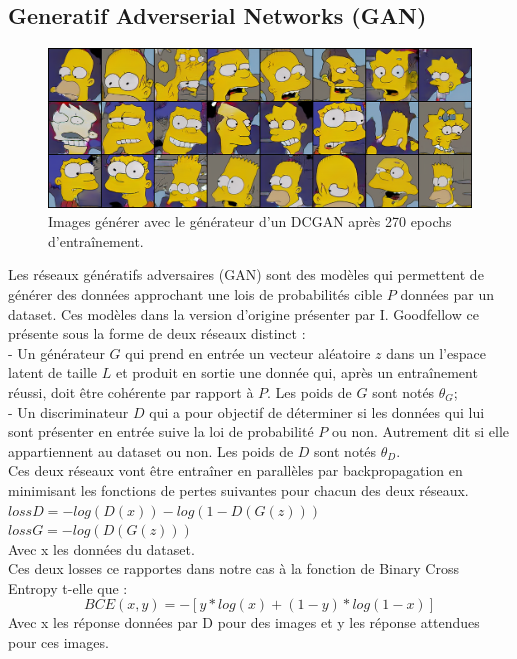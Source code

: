 \documentclass[11pt,francais]{article}
\begin{document}
\subsection{Generatif Adverserial Networks (GAN)}
\label{sec:GAN}

\begin{figure}[!h]
    \centering
    \includegraphics[width=\textwidth]{Figures/resultats_simpsons/DCGAN_270.png}
    \caption{Images générer avec le générateur d'un DCGAN après 270 epochs d'entraînement.}
    \label{fig:fig3}
\end{figure}

Les réseaux génératifs adversaires (GAN) sont des modèles qui permettent de générer des données approchant une lois de probabilités cible \(P\) données par un dataset.
Ces modèles dans la version d'origine présenter par I. Goodfellow \cite{NIPS2014_5423} ce présente sous la forme de deux réseaux distinct : \\
  - Un générateur \(G\) qui prend en entrée un vecteur aléatoire \(z\) dans un l'espace latent de taille \(L\) et produit en sortie une donnée qui, après un entraînement réussi, doit être cohérente par rapport à \(P\). Les poids de \(G\) sont notés \(\theta_G\);\\
  - Un discriminateur \(D\) qui a pour objectif de déterminer si les données qui lui sont présenter en entrée suive la loi de probabilité \(P\) ou non. Autrement dit si elle appartiennent au dataset ou non.
  Les poids de \(D\) sont notés \(\theta_D\).\\
Ces deux réseaux vont être entraîner en parallèles par backpropagation en minimisant les fonctions de pertes suivantes pour chacun des deux réseaux.\\
\(lossD = -log(D(x)) - log(1-D(G(z))) \) \\
\(lossG = -log(D(G(z))) \) \\
Avec x les données du dataset.\\
Ces deux losses ce rapportes dans notre cas à la fonction de Binary Cross Entropy t-elle que : 
\[
BCE(x, y) = -[y * log(x) + (1 - y) * log(1 - x)]
\]
Avec x les réponse données par D pour des images et y les réponse attendues pour ces images.
\end{document}
